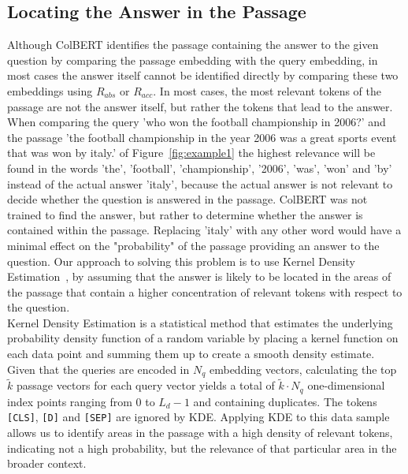\documentclass[11pt]{article}
\begin{document}
\subsection{Locating the Answer in the Passage}
\label{chap:kde}
Although ColBERT identifies the passage containing the answer to the given question by comparing the passage embedding with the query embedding, in most cases the answer itself cannot be identified directly by comparing these two embeddings using $R_{abs}$ or $R_{acc}$.
In most cases, the most relevant tokens of the passage are not the answer itself, but rather the tokens that lead to the answer.
When comparing the query 'who won the football championship in 2006?' and the passage 'the football championship in the year 2006 was a great sports event that was won by italy.' of Figure~\ref{fig:example1} the highest relevance will be found in the words 'the', 'football', 'championship', '2006', 'was', 'won' and 'by' instead  of the actual answer 'italy', because the actual answer is not relevant to decide whether the question is answered in the passage. 
ColBERT was not trained to find the answer, but rather to determine whether the answer is contained within the passage.
Replacing 'italy' with any other word would have a minimal effect on the "probability" of the passage providing an answer to the question. 
Our approach to solving this problem is to use Kernel Density Estimation~\cite{kde}, by assuming that the answer is likely to be located in the areas of the passage that contain a higher concentration of relevant tokens with respect to the question.
\\
Kernel Density Estimation is a statistical method that estimates the underlying probability density function of a random variable by placing a kernel function on each data point and summing them up to create a smooth density estimate.
Given that the queries are encoded in $N_q$ embedding vectors, calculating the top ${\tilde{k}}$ passage vectors for each query vector yields a total of ${\tilde{k}} \cdot N_q$ one-dimensional index points ranging from $0$ to $L_d-1$ and containing duplicates.
The tokens \texttt{[CLS]}, \texttt{[D]} and \texttt{[SEP]} are ignored by KDE.
Applying KDE to this data sample allows us to identify areas in the passage with a high density of relevant tokens, indicating not a high probability, but the relevance of that particular area in the broader context.
\end{document}
